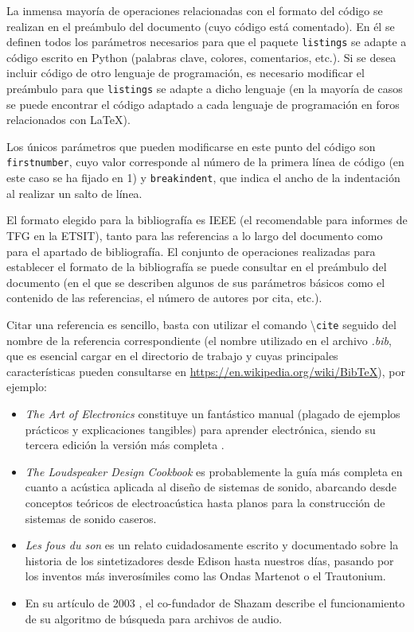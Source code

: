 \documentclass[a4paper, 11pt, spanish, twoside]{article}
\begin{document}
La inmensa mayoría de operaciones relacionadas con el formato del código se realizan en el preámbulo del documento (cuyo código está comentado). En él se definen todos los parámetros necesarios para que el paquete \texttt{listings} se adapte a código escrito en Python (palabras clave, colores, comentarios, etc.). Si se desea incluir código de otro lenguaje de programación, es necesario modificar el preámbulo para que \texttt{listings} se adapte a dicho lenguaje (en la mayoría de casos se puede encontrar el código adaptado a cada lenguaje de programación en foros relacionados con \LaTeX).

Los únicos parámetros que pueden modificarse en este punto del código son \texttt{firstnumber}, cuyo valor corresponde al número de la primera línea de código (en este caso se ha fijado en 1) y \texttt{breakindent}, que indica el ancho de la indentación al realizar un salto de línea.




\newpage

El formato elegido para la bibliografía es IEEE (el recomendable para informes de TFG en la ETSIT), tanto para las referencias a lo largo del documento como para el apartado de bibliografía. El conjunto de operaciones realizadas para establecer el formato de la bibliografía se puede consultar en el preámbulo del documento (en el que se describen algunos de sus parámetros básicos como el contenido de las referencias, el número de autores por cita, etc.).

Citar una referencia es sencillo, basta con utilizar el comando \textbackslash\texttt{cite} seguido del nombre de la referencia correspondiente (el nombre utilizado en el archivo \textit{.bib}, que es esencial cargar en el directorio de trabajo y cuyas principales características pueden consultarse en \url{https://en.wikipedia.org/wiki/BibTeX}), por ejemplo:

\begin{itemize}
    \item \textit{The Art of Electronics} constituye un fantástico manual (plagado de ejemplos prácticos y explicaciones tangibles) para aprender electrónica, siendo su tercera edición la versión más completa \cite{horowitz2015}.
    \item \textit{The Loudspeaker Design Cookbook} \cite{dickson2007} es probablemente la guía más completa en cuanto a acústica aplicada al diseño de sistemas de sonido, abarcando desde conceptos teóricos de electroacústica hasta planos para la construcción de sistemas de sonido caseros.
    \item \textit{Les fous du son} \cite{dewilde2016} es un relato cuidadosamente escrito y documentado sobre la historia de los sintetizadores desde Edison hasta nuestros días, pasando por los inventos más inverosímiles como las Ondas Martenot o el Trautonium.
    \item En su artículo de 2003 \cite{wang2003}, el co-fundador de Shazam describe el funcionamiento de su algoritmo de búsqueda para archivos de audio.
\end{itemize}
\end{document}
